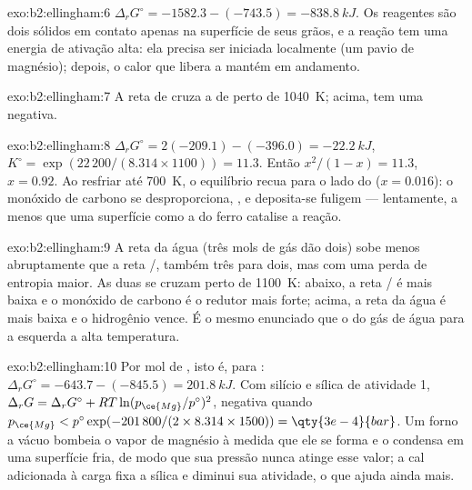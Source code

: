 \begin{solution}{exo:b2:ellingham:6}
$\Delta_r G^\circ = -1582.3 - (-743.5) = \qty{-838.8}{kJ}$. Os reagentes são
dois sólidos em contato apenas na superfície de seus grãos, e a reação tem
uma energia de ativação alta: ela precisa ser iniciada localmente (um pavio
de magnésio); depois, o calor que libera a mantém em andamento.
\end{solution}

\begin{solution}{exo:b2:ellingham:7}
A reta de  cruza a de  perto de
\qty{1040}{K}; acima,  tem uma  negativa.
\end{solution}

\begin{solution}{exo:b2:ellingham:8}
$\Delta_r G^\circ = 2(-209.1) - (-396.0) = \qty{-22.2}{kJ}$, $K^\circ =
\exp(22\,200/(8.314 \times 1100)) = 11.3$. Então $x^2/(1 - x) = 11.3$, $x =
0.92$. Ao resfriar até \qty{700}{K}, o equilíbrio recua para o lado do 
($x = 0.016$): o monóxido de carbono se desproporciona, , e
deposita-se fuligem --- lentamente, a menos que uma superfície como a do ferro
catalise a reação.
\end{solution}

\begin{solution}{exo:b2:ellingham:9}
A reta da água (três mols de gás dão dois) sobe menos abruptamente que a
reta /, também três para dois, mas com uma perda de entropia
maior. As duas se cruzam perto de \qty{1100}{K}: abaixo, a reta
/ é mais baixa e o monóxido de carbono é o redutor mais forte;
acima, a reta da água é mais baixa e o hidrogênio vence. É o mesmo enunciado
que o  do gás de água 
para a esquerda a alta temperatura.
\end{solution}

\begin{solution}{exo:b2:ellingham:10}
Por mol de , isto é, para : $\Delta_r
G^\circ = -643.7 - (-845.5) = \qty{+201.8}{kJ}$. Com silício e sílica de
atividade 1, $\Delta_r G = \Delta_r G^\circ + RT\ln(p_{\ce{Mg}}/p^\circ)^2$, negativa
quando $p_{\ce{Mg}} < p^\circ\exp(-201\,800/(2 \times 8.314 \times 1500)) =
\qty{3e-4}{bar}$. Um forno a vácuo bombeia o vapor de magnésio à medida que
ele se forma e o condensa em uma superfície fria, de modo que sua pressão
nunca atinge esse valor; a cal adicionada à carga fixa a sílica e diminui sua
atividade, o que ajuda ainda mais.
\end{solution}

